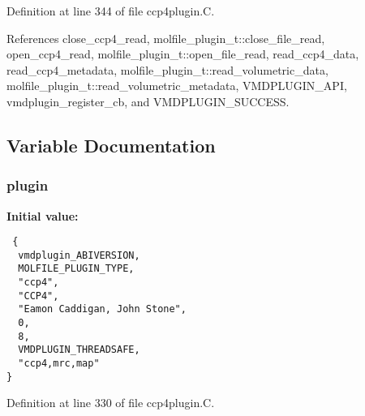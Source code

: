 Definition at line 344 of file ccp4plugin.C.

References close\_\-ccp4\_\-read, molfile\_\-plugin\_\-t::close\_\-file\_\-read, open\_\-ccp4\_\-read, molfile\_\-plugin\_\-t::open\_\-file\_\-read, read\_\-ccp4\_\-data, read\_\-ccp4\_\-metadata, molfile\_\-plugin\_\-t::read\_\-volumetric\_\-data, molfile\_\-plugin\_\-t::read\_\-volumetric\_\-metadata, VMDPLUGIN\_\-API, vmdplugin\_\-register\_\-cb, and VMDPLUGIN\_\-SUCCESS.

\subsection{Variable Documentation}
\subsubsection{ plugin\hspace{0.3cm}{\tt  [static]}}\label{ccp4plugin_8C_a2}


{\bf Initial value:}

\footnotesize\begin{verbatim} {
  vmdplugin_ABIVERSION,               
  MOLFILE_PLUGIN_TYPE,                
  "ccp4",                             
  "CCP4",                             
  "Eamon Caddigan, John Stone",       
  0,                                  
  8,                                  
  VMDPLUGIN_THREADSAFE,               
  "ccp4,mrc,map"                      
}\end{verbatim}\normalsize 


Definition at line 330 of file ccp4plugin.C.
